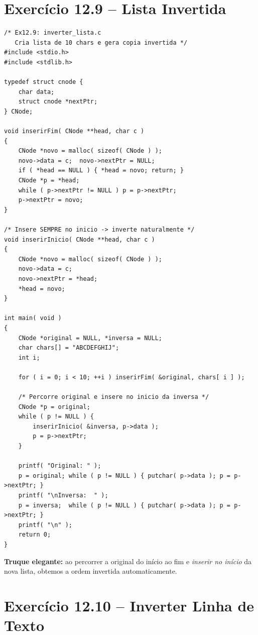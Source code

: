 \documentclass[12pt,a4paper]{article}
\begin{document}
\newpage

\section{Exercício 12.9 -- Lista Invertida}

\begin{respostabox}
\begin{lstlisting}
/* Ex12.9: inverter_lista.c
   Cria lista de 10 chars e gera copia invertida */
#include <stdio.h>
#include <stdlib.h>

typedef struct cnode {
    char data;
    struct cnode *nextPtr;
} CNode;

void inserirFim( CNode **head, char c )
{
    CNode *novo = malloc( sizeof( CNode ) );
    novo->data = c;  novo->nextPtr = NULL;
    if ( *head == NULL ) { *head = novo; return; }
    CNode *p = *head;
    while ( p->nextPtr != NULL ) p = p->nextPtr;
    p->nextPtr = novo;
}

/* Insere SEMPRE no inicio -> inverte naturalmente */
void inserirInicio( CNode **head, char c )
{
    CNode *novo = malloc( sizeof( CNode ) );
    novo->data = c;
    novo->nextPtr = *head;
    *head = novo;
}

int main( void )
{
    CNode *original = NULL, *inversa = NULL;
    char chars[] = "ABCDEFGHIJ";
    int i;

    for ( i = 0; i < 10; ++i ) inserirFim( &original, chars[ i ] );

    /* Percorre original e insere no inicio da inversa */
    CNode *p = original;
    while ( p != NULL ) {
        inserirInicio( &inversa, p->data );
        p = p->nextPtr;
    }

    printf( "Original: " );
    p = original; while ( p != NULL ) { putchar( p->data ); p = p->nextPtr; }
    printf( "\nInversa:  " );
    p = inversa;  while ( p != NULL ) { putchar( p->data ); p = p->nextPtr; }
    printf( "\n" );
    return 0;
}
\end{lstlisting}

\textbf{Truque elegante:} ao percorrer a original do início ao fim e \textit{inserir
no início} da nova lista, obtemos a ordem invertida automaticamente.
\end{respostabox}

\newpage

\section{Exercício 12.10 -- Inverter Linha de Texto}
\end{document}
